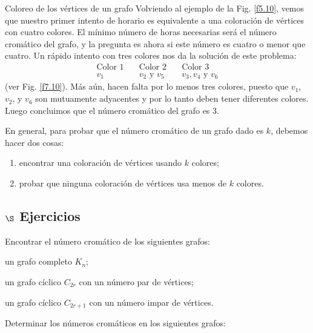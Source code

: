 \begin{section}{Coloreo de los vértices de un grafo}
Volviendo al ejemplo de la Fig. \ref{f5.10}, vemos que nuestro primer intento de horario es equivalente a una coloración de vértices con cuatro colores. El mínimo número de horas necesarias será el número cromático del grafo, y la pregunta es ahora si este número es cuatro o menor que cuatro. Un rápido intento con tres
colores nos da la solución de este problema: 
$$
\begin{matrix}
\text{Color 1}\quad &\text{Color 2}\quad&\text{Color 3} \\
v_1 &v_2 \text{ y } v_5 \quad & v_3,v_4 \text{ y } v_6 
\end{matrix}
$$
(ver Fig. \ref{f7.10}). 
Más aún, hacen falta por lo menos tres colores, puesto que $v_1$, $v_2$, y $v_6$ son mutuamente adyacentes y por lo tanto deben tener diferentes colores. Luego concluimos que el número cromático del grafo es $3$.


En general, para probar que el número cromático de un grafo dado es $k$, debemos hacer dos cosas:
\begin{enumerate}[label=\textit{\alph*)}] 
    \item  encontrar una coloración de vértices usando $k$ colores;
    \item  probar que ninguna coloración de vértices usa menos de $k$ colores.
\end{enumerate}

\subsection*{$\S$ Ejercicios}
\begin{enumex}
\item \label{ejercicio5.6.1} Encontrar el número cromático de los siguientes grafos:
\begin{enumex}
    \item un grafo completo $K_n$;
    
    \item un grafo cíclico $C_{2r}$ con un número par de vértices;
    
    \item un grafo cíclico $C_{2r+1}$ con un número impar de vértices.
\end{enumex}

\item  Determinar los números cromáticos en los siguientes grafos:


\end{enumex}
\end{section}
